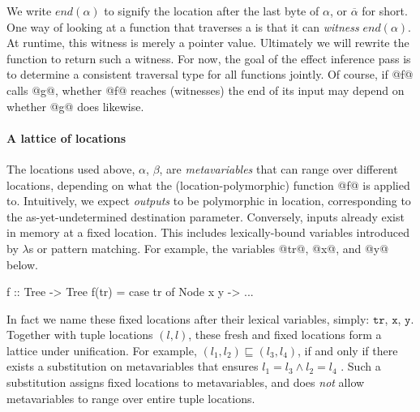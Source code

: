 \documentclass[a4paper,english]{lipics-v2016}
\newcommand{\fresh}[1]{\ensuremath{#1}}
\newcommand{\fixed}[1]{\ensuremath{\texttt{#1}}}
\newcommand{\freshA}{\fresh{\alpha}}
\newcommand{\freshB}{\fresh{\beta}}
\newcommand{\locend}[1]{\ensuremath{\overline{#1}}}
\begin{document}
We write $end(\freshA)$ to signify the location after the last byte of \freshA,
or \locend{\freshA} for short.  One way of looking at a function that traverses
a is that it can {\em witness} $end(\freshA)$.  At runtime, this witness is
merely a pointer value.
%
Ultimately we will rewrite the function to return such a witness.  For now, the
goal of the effect inference pass is to determine a consistent traversal type for all
functions jointly.
%
Of course, if @f@ calls @g@, whether @f@ reaches (witnesses) the end of its
input may depend on whether @g@ does likewise.

\paragraph*{A lattice of locations}

The locations used above, \freshA, \freshB, are {\em metavariables} that can range
over different locations, depending on what the (location-polymorphic) function
@f@ is applied to.
%
Intuitively, we expect {\em outputs} to be polymorphic in location,
corresponding to the as-yet-undetermined destination parameter.  Conversely,
inputs already exist in memory at a fixed location.
%
This includes lexically-bound variables introduced by $\lambda$s or
pattern matching.
For example, the variables @tr@, @x@, and @y@ below.

\begin{code}
f :: Tree -> Tree
f(tr) = case tr of Node x y -> ...
\end{code}

In fact we name these fixed locations after their lexical variables, simply:
\fixed{tr}, \fixed{x}, \fixed{y}.  Together with tuple locations $(l,l)$, these
fresh and fixed locations form a lattice under unification.
For example, $(l_1,l_2)\sqsubseteq (l_3,l_4)$, if and only if there exists a
substitution on metavariables that ensures $l_1 = l_3 \wedge l_2 = l_4$ .
%
Such a substitution assigns fixed locations to metavariables, and does {\em not}
allow metavariables to range over entire tuple locations.  

\end{document}
